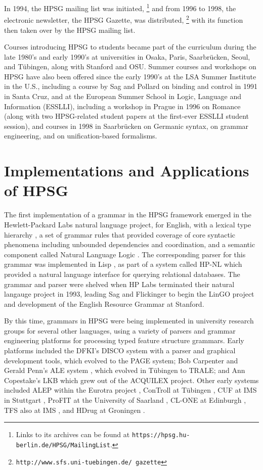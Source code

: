 \documentclass[output=paper]{langsci/langscibook}
\begin{document}
In 1994, the HPSG mailing list was initiated, \footnote{Links to its archives can be found at {\tt https://hpsg.hu-berlin.de/HPSG/MailingList}.} and from 1996 to 1998, the electronic newsletter, the HPSG Gazette, was distributed, \footnote{\tt http://www.sfs.uni-tuebingen.de/~gazette} with its function then taken over by the HPSG mailing list.

Courses introducing HPSG to students became part of the curriculum during the late 1980's and early 1990's at universities in Osaka, Paris, Saarbr{\"u}cken, Seoul, and T{\"u}bingen, along with Stanford and OSU.  Summer courses and workshops on HPSG have also been offered since the early 1990's at the LSA Summer Institute in the U.S., including a course by Sag and Pollard on binding and control in 1991 in Santa Cruz, and at the European Summer School in Logic, Language and Information (ESSLLI), including a workshop in Prague in 1996 on Romance (along with two HPSG-related student papers at the first-ever ESSLLI student session), and courses in 1998 in Saarbr{\"u}cken on Germanic syntax, on grammar engineering, and on unification-based formalisms.
    

\section{Implementations and Applications of HPSG}

The first implementation of a grammar in the HPSG framework emerged in the Hewlett-Packard Labs natural language project, for English, with a lexical type hierarchy \citep{FPW85a}, a set of grammar rules that provided coverage of core syntactic phenomena including unbounded dependencies and coordination, and a semantic component called Natural Language Logic \citep{LaubNerb1991}.  The corresponding parser for this grammar was implemented in Lisp \citep{PP85}, as part of a system called HP-NL \citep{NerProud1987} which provided a natural language interface for querying relational databases.  The grammar and parser were shelved when HP Labs terminated their natural langauge project in 1993, leading Sag and Flickinger to begin the LinGO project and development of the English Resource Grammar at Stanford.

By this time, grammars in HPSG were being implemented in university research groups for several other languages, using a variety of parsers and grammar engineering platforms for processing typed feature structure grammars.  Early platforms included the DFKI's DISCO system \citep{DISCO94} with a parser and graphical development tools, which evolved to the PAGE system; Bob Carpenter and Gerald Penn's ALE system \citep{CP96}, which evolved in T{\"u}bingen to TRALE; and Ann Copestake's LKB \citep{Copestake2002a-Short} which grew out of the ACQUILEX project.  Other early systems included ALEP within the Eurotra project \citep{SimpGron1994}, ConTroll at T{\"u}bingen \citep{GoetzMeurers1997}, CUF at IMS in Stuttgart \citep{DD93a-u}, ProFIT at the University of Saarland \citep{Erbach95a}, CL-ONE at Edinburgh \citep{Manandhar1994}, TFS also at IMS \citep{Emele94a-u}, and HDrug at Groningen \citep{NB97b-u}.  
\end{document}

